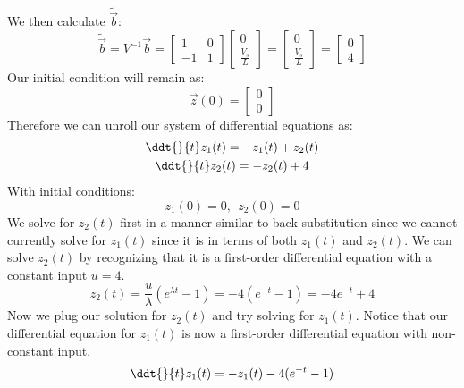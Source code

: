 {  We then calculate $\widetilde{\vec{b}}:$
  $$\widetilde{\vec{b}} = V^{-1} \vec{b} = \begin{bmatrix} 1 & 0 \\ -1 & 1 \end{bmatrix} \begin{bmatrix} 0 \\ \frac{V_s}{L} \end{bmatrix} = \begin{bmatrix} 0 \\ \frac{V_s}{L} \end{bmatrix} = \begin{bmatrix} 0 \\ 4 \end{bmatrix}$$
  Our initial condition will remain as:
  $$\vec{z}(0) = \begin{bmatrix} 0 \\ 0 \end{bmatrix}$$
  Therefore we can unroll our system of differential equations as:
  \begin{gather*}
  \ddt{}{t} z_{1}(t) = -z_{1}(t) + z_{2}(t) \\
  \ddt{}{t} z_{2}(t) = -z_{2}(t) + 4 \\
  \end{gather*}
  With initial conditions:
  $$z_{1}(0) = 0, \ \  z_{2}(0) = 0$$
  We solve for $z_{2}(t)$ first in a manner similar to back-substitution since we cannot currently solve for $z_{1}(t)$ since it is in terms of both $z_{1}(t)$ and $z_{2}(t).$ 
  We can solve $z_{2}(t)$ by recognizing that it is a first-order differential equation with a constant input $u = 4.$ 
  $$z_{2}(t) = \frac{u}{\lambda} (e^{\lambda t} - 1) = -4 (e^{-t} - 1) = -4e^{-t} + 4$$
  Now we plug our solution for $z_{2}(t)$ and try solving for $z_{1}(t).$ 
  Notice that our differential equation for $z_{1}(t)$ is now a first-order differential equation with non-constant input.
  \begin{equation}
  \ddt{}{t} z_{1}(t) = - z_{1}(t) - 4(e^{- t} - 1)
  \end{equation}

}
